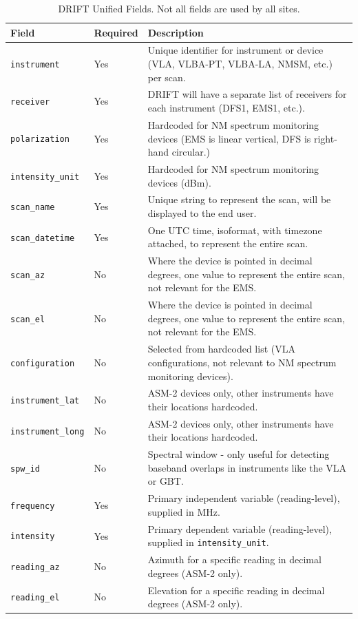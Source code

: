\documentclass[titlepage]{article}
\begin{document}
\begin{table}[!htb]
  \begin{center}
    \begin{tabularx}{\linewidth}{l|l|X}
      Field       & Required  & Description \\ \hline
      \lstinline|instrument|    & Yes & Unique identifier for instrument or device (VLA, VLBA-PT, VLBA-LA, NMSM, etc.) per scan.\\
      \lstinline|receiver|      & Yes & DRIFT will have a separate list of receivers for each instrument (DFS1, EMS1, etc.). \\
      \lstinline|polarization|  & Yes & Hardcoded for NM spectrum monitoring devices (EMS is linear vertical, DFS is right-hand circular.)\\
      \lstinline|intensity_unit|& Yes & Hardcoded for NM spectrum monitoring devices (dBm). \\
      \lstinline|scan_name|     & Yes & Unique string to represent the scan, will be displayed to the end user.\\
      \lstinline|scan_datetime| & Yes & One UTC time, isoformat, with timezone attached, to represent the entire scan.\\
      \lstinline|scan_az|       & No  & Where the device is pointed in decimal degrees, one value to represent the entire scan, not relevant for the EMS.\\
      \lstinline|scan_el|       & No  & Where the device is pointed in decimal degrees, one value to represent the entire scan, not relevant for the EMS.\\
      \lstinline|configuration| & No  & Selected from hardcoded list (VLA configurations, not relevant to NM spectrum monitoring devices).\\
      \lstinline|instrument_lat|& No  & ASM-2 devices only, other instruments have their locations hardcoded.\\
      \lstinline|instrument_long|&No  & ASM-2 devices only, other instruments have their locations hardcoded.\\
      \lstinline|spw_id|        & No  & Spectral window - only useful for detecting baseband overlaps in instruments like the VLA or GBT.\\
      \lstinline|frequency|     & Yes & Primary independent variable (reading-level), supplied in MHz.\\
      \lstinline|intensity|     & Yes & Primary dependent variable (reading-level), supplied in \lstinline|intensity_unit|.\\
      \lstinline|reading_az|    & No  & Azimuth for a specific reading in decimal degrees (ASM-2 only).\\
      \lstinline|reading_el|    & No  & Elevation for a specific reading in decimal degrees (ASM-2 only).\\
    \end{tabularx}
  \end{center}
  \caption{DRIFT Unified Fields. Not all fields are used by all sites.}\label{tab:driftdata}
\end{table}
\end{document}
